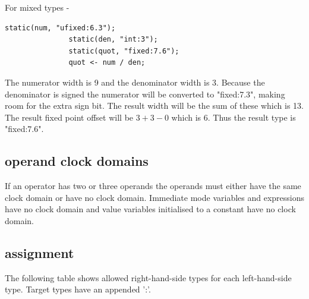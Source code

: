             For mixed types -
            \begin{lstlisting}[gobble=12, language=threepl]
               static(num, "ufixed:6.3");
               static(den, "int:3");
               static(quot, "fixed:7.6");
               quot <- num / den;
            \end{lstlisting}
            The numerator width is 9 and the denominator width is 3. Because the
            denominator is signed the numerator will be converted to
            "fixed:7.3", making room for the extra sign bit. The result width
            will be the sum of these which is 13. The result fixed point offset
            will be $3 + 3 - 0$ which is 6. Thus the result type is "fixed:7.6".
            
        
        \subsection{operand clock domains}

            If an operator has two or three operands the operands must either
            have the same clock domain or have no clock domain.
            Immediate mode variables and expressions have no clock domain
            and value variables initialised to a constant have no clock domain.


        \subsection{assignment}\label{sec:assignments}

            The following table shows allowed right-hand-side types for each
            left-hand-side type. Target types have an appended ':'.

